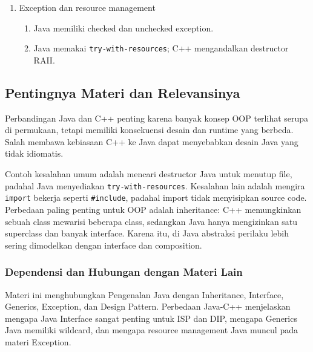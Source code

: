 \begin{enumerate}
    \begin{enumerate}
        \item C++ template bekerja saat kompilasi dan menghasilkan instansiasi tipe.
        \item Java generics memakai type erasure untuk menjaga kompatibilitas bytecode.
    \end{enumerate}
    \item Exception dan resource management
    \begin{enumerate}
        \item Java memiliki checked dan unchecked exception.
        \item Java memakai \texttt{try-with-resources}; C++ mengandalkan destructor RAII.
    \end{enumerate}
\end{enumerate}

\subsection{Pentingnya Materi dan Relevansinya}

\begin{jawab}
Perbandingan Java dan C++ penting karena banyak konsep OOP terlihat serupa di permukaan, tetapi memiliki konsekuensi desain dan runtime yang berbeda. Salah membawa kebiasaan C++ ke Java dapat menyebabkan desain Java yang tidak idiomatis.
\end{jawab}

Contoh kesalahan umum adalah mencari destructor Java untuk menutup file, padahal Java menyediakan \texttt{try-with-resources}. Kesalahan lain adalah mengira \texttt{import} bekerja seperti \texttt{\#include}, padahal import tidak menyisipkan source code. Perbedaan paling penting untuk OOP adalah inheritance: C++ memungkinkan sebuah class mewarisi beberapa class, sedangkan Java hanya mengizinkan satu superclass dan banyak interface. Karena itu, di Java abstraksi perilaku lebih sering dimodelkan dengan interface dan composition.

\subsubsection{Dependensi dan Hubungan dengan Materi Lain}

Materi ini menghubungkan Pengenalan Java dengan Inheritance, Interface, Generics, Exception, dan Design Pattern. Perbedaan Java-C++ menjelaskan mengapa Java Interface sangat penting untuk ISP dan DIP, mengapa Generics Java memiliki wildcard, dan mengapa resource management Java muncul pada materi Exception.


